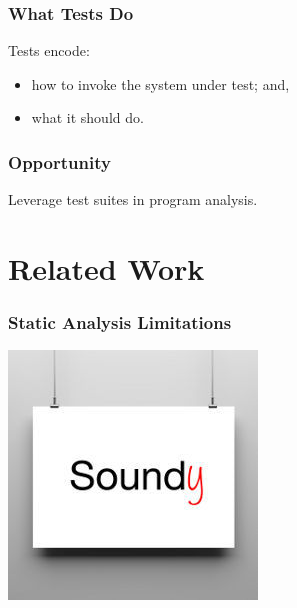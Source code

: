 \documentclass{beamer}
\newenvironment{changemargin}[1]{%
  \begin{list}{}{%
    \setlength{\topsep}{0pt}%
    \setlength{\leftmargin}{#1}%
    \setlength{\rightmargin}{1em}
    \setlength{\listparindent}{\parindent}%
    \setlength{\itemindent}{\parindent}%
    \setlength{\parsep}{\parskip}%
  }%
  \item[]}{\end{list}}
\begin{document}
\begin{frame}
  \frametitle{What Tests Do}

\Large 
\begin{changemargin}{1cm}
Tests encode:
\begin{itemize}
\item how to invoke the system under test; and,
\item what it should do.
\end{itemize}
\end{changemargin}

\end{frame}

\begin{frame}
  \frametitle{Opportunity}
\begin{center}
\Large
  Leverage test suites in program analysis.
\end{center}
\end{frame}

\section{Related Work}

\begin{frame}
  \frametitle{Static Analysis Limitations}
\centering
\includegraphics[width=.6\textwidth]{images/soundy.jpg}
\end{frame}
\end{document}
